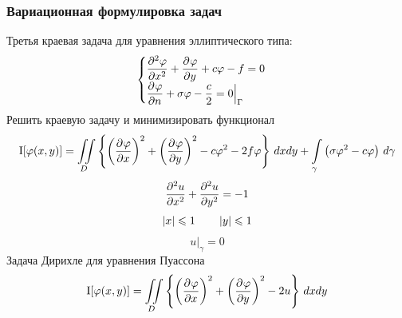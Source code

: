 \subsubsection{Вариационная формулировка задач}
Третья краевая задача для уравнения эллиптического типа:
\[
	\begin{cases}
		\displaystyle\frac{\partial^{2}\varphi}{\partial x^{2}} + \frac{\partial^{}\varphi}{\partial y^{}} + c \varphi - f = 0\\
		\displaystyle\frac{\partial^{}\varphi}{\partial n^{}} + \sigma \varphi - \frac{c}{2} = 0 \Big|_\Gamma
	\end{cases}
\]
Решить краевую задачу и минимизировать функционал
\[
	\mathrm{I} [\varphi(x, y)] = \iint\limits_D \left\{\left(\frac{\partial^{}\varphi}{\partial x^{}} \right)^2 + \left(\frac{\partial^{}\varphi}{\partial y^{}} \right)^2 - c \varphi^2 - 2 f \varphi \right\}\, dx dy + \int\limits_\gamma \left(\sigma \varphi^2 - c \varphi\right)\, d\gamma
\]
\[
	\frac{\partial^{2}u}{\partial x^{2}} + \frac{\partial^{2}u}{\partial y^{2}} = - 1
\]
\[
	\left | x \right | \leqslant 1 \qquad \left | y \right | \leqslant 1
\]
\[
	u\big|_\gamma = 0
\]
Задача Дирихле для уравнения Пуассона
\[
		\mathrm{I} [\varphi(x, y)] = \iint\limits_D \left\{\left(\frac{\partial^{}\varphi}{\partial x^{}} \right)^2 + \left(\frac{\partial^{}\varphi}{\partial y^{}} \right)^2  - 2 u \right\}\, dx dy 
\]
